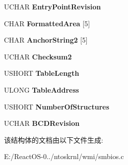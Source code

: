\begin{DoxyCompactItemize}
U\+C\+H\+AR {\bfseries Entry\+Point\+Revision}
\item 
\mbox{\label{struct___s_m_b_i_o_s21___e_n_t_r_y___p_o_i_n_t_a17241f686e1e916f78cc9f17f26fe516}} 
C\+H\+AR {\bfseries Formatted\+Area} \mbox{[}5\mbox{]}
\item 
\mbox{\label{struct___s_m_b_i_o_s21___e_n_t_r_y___p_o_i_n_t_a6c83554d9e924360fc69a561df7eea83}} 
C\+H\+AR {\bfseries Anchor\+String2} \mbox{[}5\mbox{]}
\item 
\mbox{\label{struct___s_m_b_i_o_s21___e_n_t_r_y___p_o_i_n_t_a5ae1c4219b6a4cb9c62c5e15b6b04711}} 
U\+C\+H\+AR {\bfseries Checksum2}
\item 
\mbox{\label{struct___s_m_b_i_o_s21___e_n_t_r_y___p_o_i_n_t_aec8eca60aa02f1a5cafb2320f22888b8}} 
U\+S\+H\+O\+RT {\bfseries Table\+Length}
\item 
\mbox{\label{struct___s_m_b_i_o_s21___e_n_t_r_y___p_o_i_n_t_a565df85429858a08ed232b13f2a37ebb}} 
U\+L\+O\+NG {\bfseries Table\+Address}
\item 
\mbox{\label{struct___s_m_b_i_o_s21___e_n_t_r_y___p_o_i_n_t_ad8edcf5fef6c6516591eaf54abe06416}} 
U\+S\+H\+O\+RT {\bfseries Number\+Of\+Structures}
\item 
\mbox{\label{struct___s_m_b_i_o_s21___e_n_t_r_y___p_o_i_n_t_af1e35933c958bffa7145b2de826c5c70}} 
U\+C\+H\+AR {\bfseries B\+C\+D\+Revision}
\end{DoxyCompactItemize}


该结构体的文档由以下文件生成\+:\begin{DoxyCompactItemize}
\item 
E\+:/\+React\+O\+S-\/0../ntoskrnl/wmi/smbios.\+c\end{DoxyCompactItemize}
